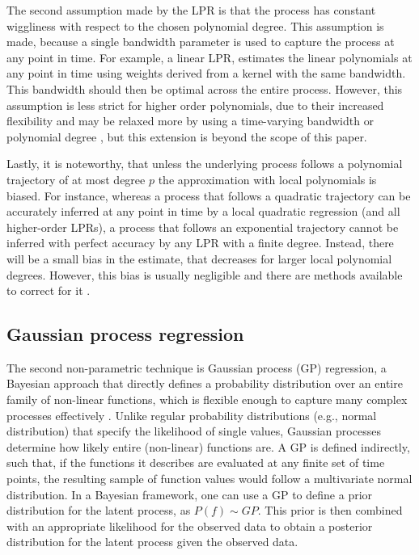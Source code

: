 \documentclass[man, floatsintext]{apa7}
\begin{document}
The second assumption made by the LPR is that the process has constant
wiggliness with respect to the chosen polynomial degree. This assumption is
made, because a single bandwidth parameter is used to capture the process at
any point in time. For example, a linear LPR, estimates the linear polynomials
at any point in time using weights derived from a kernel with the same
bandwidth. This bandwidth should then be optimal across the entire process.
However, this assumption is less strict for higher order polynomials, due to
their increased flexibility and may be relaxed more by using a time-varying
bandwidth \parencite{fan_data-driven_1995} or polynomial degree
\parencite{fan_adaptive_1995}, but this extension is beyond the scope of this
paper.

Lastly, it is noteworthy, that unless the underlying process follows a
polynomial trajectory of at most degree $p$ the approximation with local
polynomials is biased. For instance, whereas a process that follows a
quadratic trajectory can be accurately inferred at any point in time
by a local quadratic regression (and all higher-order LPRs), a process that
follows an exponential trajectory cannot be inferred with perfect accuracy
by any LPR with a finite degree. Instead, there will be a small bias in the
estimate, that decreases for larger local polynomial degrees.
However, this bias is usually negligible and there are methods available to
correct for it \parencite{R-nprobust}.

\subsection{Gaussian process regression}

The second non-parametric technique is Gaussian process (GP) regression, a
Bayesian approach that directly defines a probability distribution over an
entire family of non-linear functions, which is flexible enough to capture many
complex processes effectively \parencite{rasmussen_gaussian_2006,
  betancourt_robust_2020, roberts_gaussian_2013}. Unlike regular probability
distributions (e.g., normal distribution) that specify the likelihood of
single values, Gaussian processes determine how likely entire
(non-linear) functions are. A GP is defined indirectly, such that, if the
functions it describes are evaluated at any finite set of time points, the
resulting sample of function values would follow a multivariate normal
distribution. In a Bayesian framework, one can use a GP to define a prior
distribution for the latent process, as $P(f) \sim GP$. This prior is then
combined with an appropriate likelihood for the observed data to obtain a
posterior distribution for the latent process given the observed data.
\end{document}
